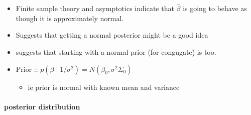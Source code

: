 \begin{itemize}
\item Finite sample theory and asymptotics indicate that
       $\hat{\beta}$ is going to behave as though it is approximately normal.
\item Suggests that getting a normal posterior might be a good idea
\item suggests that starting with a normal prior (for congugate) is too.
\item Prior :: $p(\beta \mid 1/\sigma^{2}) = N(\beta_{0}, \sigma^2 \Sigma_{0})$
\begin{itemize}
\item ie prior is normal with known mean and variance
\end{itemize}
\end{itemize}
\paragraph{posterior distribution}
\label{sec-4-1-1}

